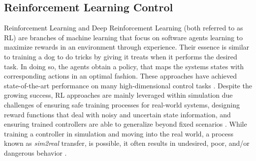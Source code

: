 \documentclass[manuscript,screen,review]{acmart}
\begin{document}





\subsection{Reinforcement Learning Control}
Reinforcement Learning and Deep Reinforcement Learning (both referred to as RL) are branches of machine learning that focus on software agents learning to maximize rewards in an environment through experience. Their essence is similar to training a dog to do tricks by giving it treats when it performs the desired task. In doing so, the agents obtain a policy, that maps the systems states with corresponding actions in an optimal fashion. These approaches have achieved state-of-the-art performance on many high-dimensional control tasks \cite{lillicrap2015continuous, schulman2017proximal, mania2018simple, haarnoja2018soft}. Despite the growing success, RL approaches are mainly leveraged within simulation due challenges of ensuring safe training processes for real-world systems, designing reward functions that deal with noisy and uncertain state information, and ensuring trained controllers are able to generalize beyond fixed scenarios \cite{dulac2019challenges}. While training a controller in simulation and moving into the real world, a process known as \emph{sim2real} transfer, is possible, it often results in undesired, poor, and/or dangerous behavior \cite{jang2019ICCPS, kadian2019we}.
\end{document}
